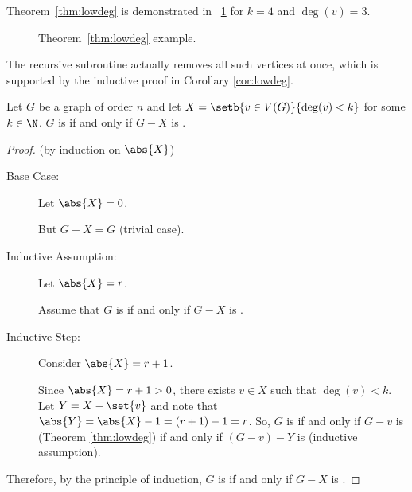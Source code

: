 Theorem~\ref{thm:lowdeg} is demonstrated in \figurename~\ref{fig:lowdeg} for \(k=4\) and \(\deg(v)=3\).

\begin{figure}[H]
  \centering
  \caption{Theorem~\ref{thm:lowdeg} example.}
  \label{fig:lowdeg}
\end{figure}

The recursive subroutine actually removes all such vertices at once, which is supported by the inductive proof in
Corollary \ref{cor:lowdeg}.

\begin{corollary}
  \label{cor:lowdeg}
  Let \(G\) be a graph of order \(n\) and let \(X=\setb{v\in V(G)}{\deg(v)<k}\) for some \(k\in\N\).  \(G\) is
   if and only if \(G-X\) is .
\end{corollary}

\begin{proof}
  (by induction on \(\abs{X}\))
  \begin{description}
  \item[Base Case:] Let \(\abs{X}=0\).

    But \(G-X=G\) (trivial case).

  \item[Inductive Assumption:] Let \(\abs{X}=r\).

    Assume that \(G\) is  if and only if \(G-X\) is .

  \item[Inductive Step:] Consider \(\abs{X}=r+1\).
    
    Since \(\abs{X}=r+1>0\), there exists \(v\in X\) such that \(\deg(v)<k\).  Let \(Y=X-\set{v}\) and note that
    \(\abs{Y}=\abs{X}-1=(r+1)-1=r\).  So, \(G\) is  if and only if \(G-v\) is  (Theorem
    \ref{thm:lowdeg}) if and only if \((G-v)-Y\) is  (inductive assumption).
  \end{description}

  Therefore, by the principle of induction, \(G\) is  if and only if \(G-X\) is .
\end{proof}

